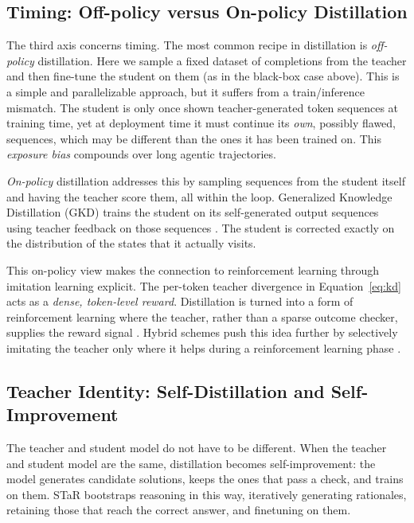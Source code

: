 \subsection{Timing: Off-policy versus On-policy Distillation}
The third axis concerns timing. The most common recipe in distillation is \emph{off-policy} distillation. Here we sample a fixed dataset of completions from the teacher and then fine-tune the student on them (as in the black-box case above). This is a simple and parallelizable approach, but it suffers from a train/inference mismatch. The student is only once shown teacher-generated token sequences at training time, yet at deployment time it must continue its \emph{own}, possibly flawed, sequences, which may be different than the ones it has been trained on. This  {\em exposure bias}  compounds over long agentic trajectories.

\emph{On-policy} distillation addresses this by sampling sequences from the student itself and having the teacher score them, all within the loop. Generalized Knowledge Distillation (GKD) trains the student on its self-generated output sequences using teacher feedback on those sequences \citep{agarwal2024policy}. The student is corrected exactly on the distribution of the states that it actually visits. 

This on-policy view makes the connection to reinforcement learning through imitation learning explicit. The per-token teacher divergence in Equation~\ref{eq:kd} acts as a \emph{dense, token-level reward}. 
Distillation is turned into a form of reinforcement learning where the teacher, rather than a sparse outcome checker, supplies the reward signal \citep{lu2025onpolicydistillation}. Hybrid schemes push this idea further by selectively imitating the teacher only where it helps during a reinforcement learning phase \citep{zhang2026reinforcementaware}.

\subsection{Teacher Identity: Self-Distillation and Self-Improvement}
The teacher and student model do not have to be different. When the teacher and student model are the same, distillation becomes self-improvement: the model generates candidate solutions, keeps the ones that pass a check, and trains on them. STaR \citep{zelikman2022star} bootstraps reasoning in this way, iteratively generating rationales, retaining those that reach the correct answer, and finetuning on them. 

